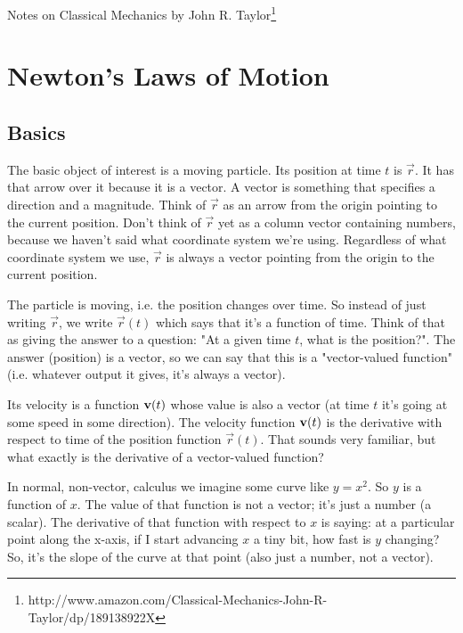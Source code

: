 \newcommand{\xhat}{\vec{\hat{x}}}
\renewcommand{\yhat}{\vec{\hat{y}}}
\newcommand{\zhat}{\vec{\hat{z}}}
\newcommand{\rhat}{\vec{\hat{r}}}
\newcommand{\phihat}{\vec{\hat{\phi}}}
\renewcommand{\a}{\vec{a}}
\renewcommand{\b}{\vec{b}}
\renewcommand{\p}{\vec{p}}
\renewcommand{\F}{\vec{F}}
\renewcommand{\r}{\vec{r}}
\renewcommand{\vector}[1]{\begin{bmatrix}#1\end{bmatrix}}



Notes on Classical Mechanics by John R. Taylor\footnote{http://www.amazon.com/Classical-Mechanics-John-R-Taylor/dp/189138922X}


\section{Newton's Laws of Motion}






\subsection{Basics}

The basic object of interest is a moving particle. Its position at time $t$ is
$\r$. It has that arrow over it because it is a vector. A vector is something
that specifies a direction and a magnitude. Think of $\r$ as an arrow from the
origin pointing to the current position. Don't think of $\r$ yet as a column
vector containing numbers, because we haven't said what coordinate system we're
using. Regardless of what coordinate system we use, $\r$ is always a vector
pointing from the origin to the current position.

The particle is moving, i.e. the position changes over time. So instead of just
writing $\r$, we write $\r(t)$ which says that it's a function of time. Think
of that as giving the answer to a question: "At a given time $t$, what is the
position?". The answer (position) is a vector, so we can say that this is a
"vector-valued function" (i.e. whatever output it gives, it's always a vector).

Its velocity is a function $\mathbf v(t)$ whose value is also a vector (at time $t$
it's going at some speed in some direction). The velocity function $\mathbf v(t)$ is
the derivative with respect to time of the position function $\r(t)$. That
sounds very familiar, but what exactly is the derivative of a vector-valued
function?

In normal, non-vector, calculus we imagine some curve like $y = x^2$. So $y$ is
a function of $x$. The value of that function is not a vector; it's just a
number (a scalar). The derivative of that function with respect to $x$ is
saying: at a particular point along the x-axis, if I start advancing $x$ a tiny
bit, how fast is $y$ changing? So, it's the slope of the curve at that point
(also just a number, not a vector).

